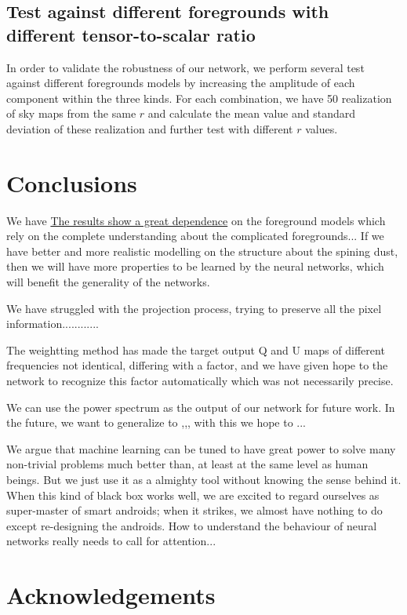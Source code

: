 \documentclass[floatfix]{emulateapj}
\begin{document}
\subsection{Test against different foregrounds with different tensor-to-scalar ratio}
In order to validate the robustness of our network, we perform several test against different foregrounds models by increasing the amplitude of each component within the three kinds. For each combination, we have 50 realization of sky maps from the same $r$ and calculate the mean value and standard deviation of these realization and further test with different $r$ values.
\section{Conclusions}\label{sect:con}
We have 
\underline{The results show a great dependence} on the foreground models which rely on the complete understanding about the complicated foregrounds... If we have better and more realistic modelling on the structure about the spining dust, then we will have more properties to be learned by the neural networks, which will benefit the generality of the networks.

We have struggled with the projection process, trying to preserve all the pixel information............ 

The weightting method has made the target output Q and U maps of different frequencies not identical, differing with a factor, and we have given hope to the network to recognize this factor automatically which was not necessarily precise.

We can use the power spectrum as the output of our network for future work.
In the future, we want to generalize to ,,, with this we hope to ...

We argue that machine learning can be tuned to have great power to solve many non-trivial problems much better than, at least at the same level as human beings. But we just use it as a almighty tool without knowing the sense behind it. When this kind of black box works well, we are excited to regard ourselves as super-master of smart androids; when it strikes, we almost have nothing to do except re-designing the androids. How to understand the behaviour of neural networks really needs to call for attention...
\section*{Acknowledgements}
\end{document}
